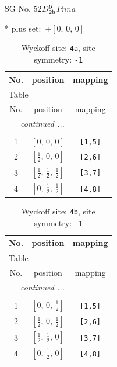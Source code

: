 \documentclass[fleqn,8pt]{jsarticle}
\begin{document}
\setcounter{MaxMatrixCols}{32}

\renewcommand{\tablename}{Table~}
\renewcommand{\figurename}{Figure~}
\begin{center}
\LARGE
SG No. 52\quad$D_{\rm 2h}^{6}$\quad$Pnna$\quad[ orthorhombic ]
\end{center}
* plus set:\,\,\,$+\left[ 0,\, 0,\, 0 \right]$
\renewcommand{\arraystretch}{1.2}
\begin{longtable}{ccc}
\caption{Wyckoff site: {\tt 4a}, site symmetry: {\tt -1}}
 \\
 \hline \hline
No. & position & mapping \\ \hline \endfirsthead

\multicolumn{2}{l}{\tablename\ \thetable{}} \\
 \hline \hline
No. & position & mapping \\ \hline \endhead

 \hline \hline
\multicolumn{2}{r}{\footnotesize\it continued ...} \\ \endfoot

 \hline \hline
\multicolumn{2}{r}{} \\ \endlastfoot

1 & $\left[ 0,\, 0,\, 0 \right]$ & {\tt [1,5]} \\ \hline
2 & $\left[ \frac{1}{2},\, 0,\, 0 \right]$ & {\tt [2,6]} \\ \hline
3 & $\left[ \frac{1}{2},\, \frac{1}{2},\, \frac{1}{2} \right]$ & {\tt [3,7]} \\ \hline
4 & $\left[ 0,\, \frac{1}{2},\, \frac{1}{2} \right]$ & {\tt [4,8]} \\
\end{longtable}
\renewcommand{\arraystretch}{1.2}
\begin{longtable}{ccc}
\caption{Wyckoff site: {\tt 4b}, site symmetry: {\tt -1}}
 \\
 \hline \hline
No. & position & mapping \\ \hline \endfirsthead

\multicolumn{2}{l}{\tablename\ \thetable{}} \\
 \hline \hline
No. & position & mapping \\ \hline \endhead

 \hline \hline
\multicolumn{2}{r}{\footnotesize\it continued ...} \\ \endfoot

 \hline \hline
\multicolumn{2}{r}{} \\ \endlastfoot

1 & $\left[ 0,\, 0,\, \frac{1}{2} \right]$ & {\tt [1,5]} \\ \hline
2 & $\left[ \frac{1}{2},\, 0,\, \frac{1}{2} \right]$ & {\tt [2,6]} \\ \hline
3 & $\left[ \frac{1}{2},\, \frac{1}{2},\, 0 \right]$ & {\tt [3,7]} \\ \hline
4 & $\left[ 0,\, \frac{1}{2},\, 0 \right]$ & {\tt [4,8]} \\
\end{longtable}
\end{document}
